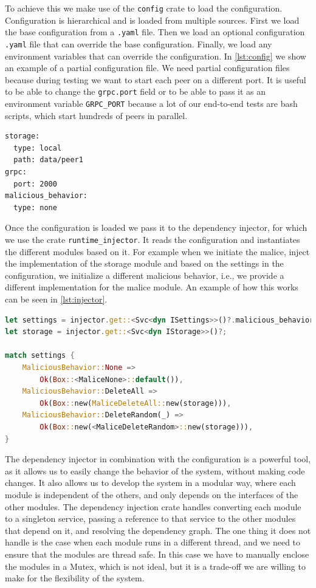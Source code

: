 To achieve this we make use of the \texttt{config} crate to load the configuration.
Configuration is hierarchical and is loaded from multiple sources.
First we load the base configuration from a \texttt{.yaml} file.
Then we load an optional configuration \texttt{.yaml} file that can override the base configuration.
Finally, we load any environment variables that can override the configuration.
In \autoref{lst:config} we show an example of a partial configuration file.
We need partial configuration files because during testing we want to start each peer on a different port.
It is useful to be able to change the \texttt{grpc.port} field or to be able to pass it as an
environment variable \texttt{GRPC\_PORT} because a lot of our end-to-end tests are bash scripts,
which start hundreds of peers in parallel.

\begin{lstlisting}[caption={Example of a configuration file}, label={lst:config}]
storage:
  type: local
  path: data/peer1
grpc:
  port: 2000
malicious_behavior:
  type: none
\end{lstlisting}

Once the configuration is loaded we pass it to the dependency injector,
for which we use the crate \texttt{runtime\_injector}.
It reads the configuration and instantiates the different modules based on it.
For example when we initiate the malice, inject the implementation of the storage module
and based on the settings in the configuration, we initialize a different malicious behavior,
i.e., we provide a different implementation for the malice module.
An example of how this works can be seen in \autoref{lst:injector}.

\begin{lstlisting}[language=Rust, style=colouredRust, caption={Example of dynamically loading a module}, label={lst:injector}]
let settings = injector.get::<Svc<dyn ISettings>>()?.malicious_behavior();
let storage = injector.get::<Svc<dyn IStorage>>()?;

match settings {
    MaliciousBehavior::None =>
        Ok(Box::<MaliceNone>::default()),
    MaliciousBehavior::DeleteAll =>
        Ok(Box::new(MaliceDeleteAll::new(storage))),
    MaliciousBehavior::DeleteRandom(_) =>
        Ok(Box::new(<MaliceDeleteRandom>::new(storage))),
}
\end{lstlisting}

The dependency injector in combination with the configuration is a powerful tool,
as it allows us to easily change the behavior of the system, without making code changes.
It also allows us to develop the system in a modular way,
where each module is independent of the others, and only depends on the interfaces of the other modules.
The dependency injection crate handles converting each module to a singleton service,
passing a reference to that service to the other modules that depend on it,
and resolving the dependency graph.
The one thing it does not handle is the case when each module runs in a different thread,
and we need to ensure that the modules are thread safe.
In this case we have to manually enclose the modules in a Mutex,
which is not ideal, but it is a trade-off we are willing to make for the flexibility of the system.

